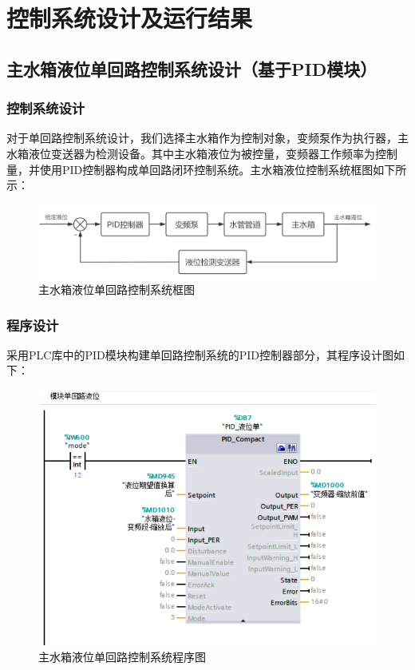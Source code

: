 \documentclass[UTF8]{article}
\begin{document}
%
\section{控制系统设计及运行结果}
\subsection{主水箱液位单回路控制系统设计（基于PID模块）}
\subsubsection{控制系统设计}
对于单回路控制系统设计，我们选择主水箱作为控制对象，变频泵作为执行器，主水箱液位变送器为检测设备。其中主水箱液位为被控量，变频器工作频率为控制量，并使用PID控制器构成单回路闭环控制系统。主水箱液位控制系统框图如下所示：
\begin{figure}[H]
    \centering %
    \includegraphics[width=.8\textwidth]{figure/主水箱液位单回路控制系统框图.png} 
    \caption{主水箱液位单回路控制系统框图} %
\end{figure}

\subsubsection{程序设计}
采用PLC库中的PID模块构建单回路控制系统的PID控制器部分，其程序设计图如下：
\begin{figure}[H]
    \centering %
    \includegraphics[width=.8\textwidth]{figure/单回路-模块.PNG} 
    \caption{主水箱液位单回路控制系统程序图} %
\end{figure}
\end{document}

